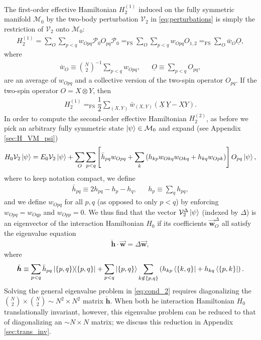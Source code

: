 \documentclass[nofootinbib,notitlepage,11pt]{revtex4-2}
\newcommand{\f}[2]{\dfrac{#1}{#2}} %
\newcommand{\p}[1]{\left(#1\right)} %
\renewcommand{\sp}[1]{\left[#1\right]} %
\renewcommand{\set}[1]{\left\{#1\right\}} %
\renewcommand{\c}{\cdot} %
\newcommand{\m}{\bm} %
\renewcommand{\v}{\vec} %
\newcommand{\1}{\mathds{1}}
\newcommand{\M}{\mathcal{M}}
\renewcommand{\P}{\mathcal{P}}
\newcommand{\V}{\mathcal{V}}
\newcommand{\EQFS}{=_{\text{FS}}}
\newcommand{\col}{\underline}
\begin{document}
The first-order effective Hamiltonian $H_2^{(1)}$ induced on the fully
symmetric manifold $\M_0$ by the two-body perturbation $\V_2$ in
\eqref{eq:perturbations} is simply the restriction of $\V_2$ onto
$\M_0$:
\begin{align}
  H_2^{(1)} = \sum_O \sum_{p<q} w_{Opq} \P_0 O_{pq} \P_0
  \EQFS \sum_O \sum_{p<q} w_{Opq} O_{1,2}
  \EQFS \sum_O \bar w_O \col{O},
\end{align}
where
\begin{align}
  \bar w_O \equiv {N \choose 2}^{-1} \sum_{p<q} w_{Opq},
  &&
  \col{O} \equiv \sum_{p<q} O_{pq},
\end{align}
are an average of $w_{Opq}$ and a collective version of the two-spin
operator $O_{pq}$.  If the two-spin operator $O=X\otimes Y$, then
\begin{align}
  H_2^{(1)} \EQFS \f12 \sum_{\p{X,Y}} \bar w_{\p{X,Y}}
  \p{\col{X}\,\col{Y} - \col{XY}}.
\end{align}
In order to compute the second-order effective Hamiltonian
$H_2^{(2)}$, as before we pick an arbitrary fully symmetric state
$\ket\psi\in\M_0$ and expand (see Appendix \ref{sec:H_VM_psi})
\begin{align}
  H_0 \V_2 \ket\psi
  = E_0 \V_2 \ket\psi
  + \sum_O \sum_{p<q} \sp{\bar h_{pq} w_{Opq}
    + \sum_k \p{h_{kp} w_{Okq} w_{Okq} + h_{kq} w_{Opk}}}
  O_{pq} \ket\psi,
  \label{eq:H_V2_psi}
\end{align}
where to keep notation compact, we define
\begin{align}
  \bar h_{pq} \equiv 2 h_{pq} - h_p - h_q,
  &&
  h_p \equiv \sum_q h_{pq},
\end{align}
and we define $w_{Opq}$ for all $p,q$ (as opposed to only $p<q$) by
enforcing $w_{Opq}=w_{Oqp}$ and $w_{Opp}=0$.  We thus find that the
vector $\V_2^\Delta\ket\psi$ (indexed by $\Delta$) is an eigenvector
of the interaction Hamiltonian $H_0$ if its coefficients
$\v{\m w}_O^\Delta$ all satisfy the eigenvalue equation
\begin{align}
  \check{\m h} \c \v{\m w} = \Delta \v{\m w},
  \label{eq:cond_2}
\end{align}
where
\begin{align}
  \check{\m h} \equiv \sum_{p<q} \bar h_{pq} \op{\set{p,q}}
  + \sum_{p<q} \ket{\set{p,q}} \sum_{k\notin\set{p,q}}
  \p{h_{kp} \bra{\set{k,q}} + h_{kq} \bra{\set{p,k}}}.
  \label{eq:h_super_mat}
\end{align}
Solving the general eigenvalue problem in \eqref{eq:cond_2} requires
diagonalizing the ${N \choose 2}\times{N \choose 2}\sim N^2\times N^2$
matrix $\check{\m h}$.  When both he interaction Hamiltonian $H_0$
translationally invariant, however, this eigenvalue problem can be
reduced to that of diagonalizing an $\sim N\times N$ matrix; we
discuss this reduction in Appendix \ref{sec:trans_inv}.
\end{document}
